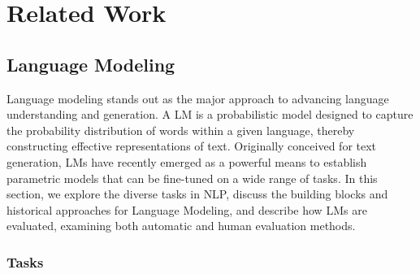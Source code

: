 \chapter{Related Work}
\label{chapter:related}


\renewcommand{\leftmark}{\spacedlowsmallcaps{Related work}}


\minitoc





\section{Language Modeling}

Language modeling stands out as the major approach to advancing language understanding and generation. A \ac{LM} is a probabilistic model designed to capture the probability distribution of words within a given language, thereby constructing effective representations of text. Originally conceived for text generation, \acp{LM} have recently emerged as a powerful means to establish parametric models that can be fine-tuned on a wide range of tasks. 
In this section, we explore the diverse tasks in \ac{NLP}, discuss the building blocks and historical approaches for Language Modeling, and describe how \acp{LM} are evaluated, examining both automatic and human evaluation methods.

\subsection{Tasks} 

